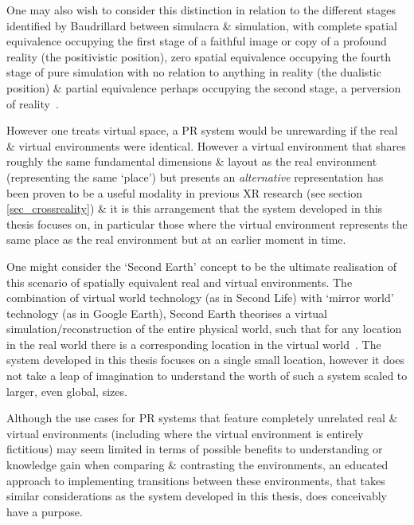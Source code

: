 One may also wish to consider this distinction in relation to the different stages identified by Baudrillard between simulacra \& simulation, with complete spatial equivalence occupying the first stage of a faithful image or copy of a profound reality (the positivistic position), zero spatial equivalence occupying the fourth stage of pure simulation with no relation to anything in reality (the dualistic position) \& partial equivalence perhaps occupying the second stage, a perversion of reality~\cite{Baudrillard1994}.


However one treats virtual space, a PR system would be unrewarding if the real \& virtual environments were identical\turklevrfootnote{}. However a virtual environment that shares roughly the same fundamental dimensions \& layout as the real environment (representing the same `place') but presents an \textit{alternative} representation has been proven to be a useful modality in previous XR research (see section \ref{sec_crossreality}) \& it is this arrangement that the system developed in this thesis focuses on, in particular those where the virtual environment represents the same place as the real environment but at an earlier moment in time.

One might consider the `Second Earth' concept to be the ultimate realisation of this scenario of spatially equivalent real and virtual environments. The combination of virtual world technology (as in Second Life) with `mirror world' technology (as in Google Earth), Second Earth theorises a virtual simulation/reconstruction of the entire physical world, such that for any location in the real world there is a corresponding location in the virtual world~\cite{Roush2007}. The system developed in this thesis focuses on a single small location, however it does not take a leap of imagination to understand the worth of such a system scaled to larger, even global, sizes.

Although the use cases for PR systems that feature completely unrelated real \& virtual environments (including where the virtual environment is entirely fictitious) may seem limited in terms of possible benefits to understanding or knowledge gain when comparing \& contrasting the environments, an educated approach to implementing transitions between these environments, that takes similar considerations as the system developed in this thesis, does conceivably have a purpose.

